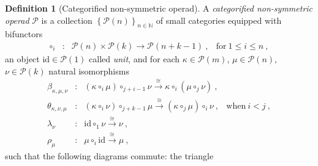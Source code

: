 \documentclass[10pt]{amsart}
\theoremstyle{definition}
\newtheorem{definition}[thm]{Definition}
\theoremstyle{remark}
\numberwithin{equation}{section}
\newcommand{\0}{\color{blue}{\mathsf{0}}}
\begin{document}
\begin{definition}[Categorified non-symmetric operad] A \emph{categorified non-symmetric operad} $\mathcal{P}$ is a collection $\left\{  \mathcal{P}(n)  \right\}_{n\in \mathbb{N}}$ of small categories equipped with bifunctors  
$$ \begin{array}{clll}
\circ_i&\colon& \mathcal{P}(n) \times
                  \mathcal{P}(k)
                  \longrightarrow \mathcal{P}(n+k-1) \ ,
                  & \text{for}\ 1 \leq i \leq n \ ,
\end{array}  $$
an object $\mathrm{id} \in \mathcal{P}(1)$ called \emph{unit}, and for each $\kappa \in \mathcal{P}(m)$,  $\mu \in \mathcal{P}(n)$, $\nu \in \mathcal{P}(k)$ natural isomorphisms 
$$ \begin{array}{clll}
    \beta_{\kappa,\mu,\nu}&\colon& 
    (\kappa \circ_i \mu) \circ_{j+i-1} \nu  \overset{\cong}{\longrightarrow} \kappa \circ_i (\mu \circ_j \nu) \ , &  \\
    \theta_{\kappa,\nu,\mu}&\colon& 
    (\kappa \circ_i \nu) \circ_{j+k-1} \mu 
    \overset{\cong}{\longrightarrow} (\kappa \circ_j \mu) \circ_i \nu \ , & \text{when}\ i < j \ , \\
    \lambda_\nu &\colon& 
    \mathrm{id} \circ_1 \nu \overset{\cong}{\longrightarrow} \nu \ , & \\
    \rho_\mu &\colon& 
    \mu \circ_i \mathrm{id} \overset{\cong}{\longrightarrow} \mu \ , & 
\end{array}  $$
such that the following diagrams commute: the triangle \\
\begin{center}
 \quad \quad 
{}
\end{center}
\end{definition}
\end{document}
